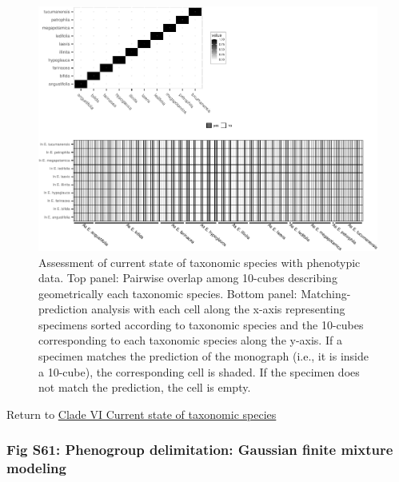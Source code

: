 \documentclass[
  11pt,
]{article}
\begin{document}
\begin{figure}
\includegraphics{Supplementary_Material_files/figure-latex/currentStateOfTaxonomyCladeVIPlots-1} \caption{Assessment of current state of taxonomic species with phenotypic data. Top panel: Pairwise overlap among 10-cubes describing geometrically each taxonomic species. Bottom panel: Matching-prediction analysis with each cell along the x-axis representing specimens sorted according to taxonomic species and the 10-cubes corresponding to each taxonomic species along the y-axis. If a specimen matches the prediction of the monograph (i.e., it is inside a 10-cube), the corresponding cell is shaded. If the specimen does not match the prediction, the cell is empty.}\label{fig:currentStateOfTaxonomyCladeVIPlots}
\end{figure}

Return to \protect\hyperlink{current-state-of-taxonomic-species-5}{Clade VI Current state of taxonomic species}
\pagebreak

\hypertarget{fig-s61-phenogroup-delimitation-gaussian-finite-mixture-modeling}{%
\subsubsection{Fig S61: Phenogroup delimitation: Gaussian finite mixture modeling}\label{fig-s61-phenogroup-delimitation-gaussian-finite-mixture-modeling}}
\end{document}
